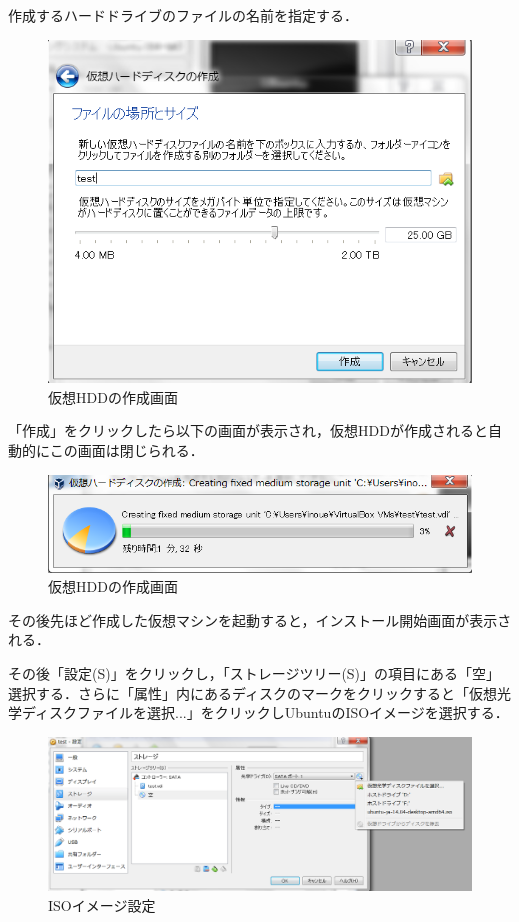 作成するハードドライブのファイルの名前を指定する．



\begin{figure}[htb]
\centering
\includegraphics[width=15cm]{vb4.png}
\caption{仮想HDDの作成画面}\label{仮想マシンの設定画面}
\end{figure}

「作成」をクリックしたら以下の画面が表示され，仮想HDDが作成されると自動的にこの画面は閉じられる．


\begin{figure}[htb]
\centering
\includegraphics[width=15cm]{vb5.png}
\caption{仮想HDDの作成画面}\label{仮想マシンの設定画面}
\end{figure}

\clearpage


その後先ほど作成した仮想マシンを起動すると，インストール開始画面が表示される．

その後「設定(S)」をクリックし，「ストレージツリー(S)」の項目にある「空」選択する．さらに「属性」内にあるディスクのマークをクリックすると「仮想光学ディスクファイルを選択...」をクリックしUbuntuのISOイメージを選択する．

\begin{figure}[htb]
\centering
\includegraphics[width=15cm]{vb6.png}
\caption{ISOイメージ設定}\label{仮想マシンの設定画面}
\end{figure}

